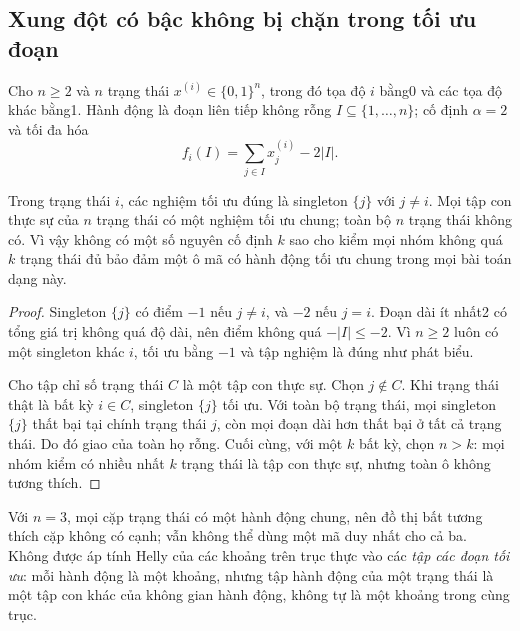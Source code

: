 \subsection{Xung đột có bậc không bị chặn trong tối ưu đoạn}
Cho $n\ge2$ và $n$ trạng thái $x^{(i)}\in\{0,1\}^n$, trong đó tọa độ $i$ bằng0 và các tọa độ khác bằng1. Hành động là đoạn liên tiếp không rỗng $I\subseteq\{1,\ldots,n\}$; cố định $\alpha=2$ và tối đa hóa
\[
f_i(I)=\sum_{j\in I}x_j^{(i)}-2|I|.
\]
\begin{theorem}\label{thm:conflict}
Trong trạng thái $i$, các nghiệm tối ưu đúng là singleton $\{j\}$ với $j\ne i$. Mọi tập con thực sự của $n$ trạng thái có một nghiệm tối ưu chung; toàn bộ $n$ trạng thái không có. Vì vậy không có một số nguyên cố định $k$ sao cho kiểm mọi nhóm không quá $k$ trạng thái đủ bảo đảm một ô mã có hành động tối ưu chung trong mọi bài toán dạng này.
\end{theorem}
\begin{proof}
Singleton $\{j\}$ có điểm $-1$ nếu $j\ne i$, và $-2$ nếu $j=i$. Đoạn dài ít nhất2 có tổng giá trị không quá độ dài, nên điểm không quá $-|I|\le-2$. Vì $n\ge2$ luôn có một singleton khác $i$, tối ưu bằng $-1$ và tập nghiệm là đúng như phát biểu.

Cho tập chỉ số trạng thái $C$ là một tập con thực sự. Chọn $j\notin C$. Khi trạng thái thật là bất kỳ $i\in C$, singleton $\{j\}$ tối ưu. Với toàn bộ trạng thái, mọi singleton $\{j\}$ thất bại tại chính trạng thái $j$, còn mọi đoạn dài hơn thất bại ở tất cả trạng thái. Do đó giao của toàn họ rỗng. Cuối cùng, với một $k$ bất kỳ, chọn $n>k$: mọi nhóm kiểm có nhiều nhất $k$ trạng thái là tập con thực sự, nhưng toàn ô không tương thích.
\end{proof}
Với $n=3$, mọi cặp trạng thái có một hành động chung, nên đồ thị bất tương thích cặp không có cạnh; vẫn không thể dùng một mã duy nhất cho cả ba. Không được áp tính Helly của các khoảng trên trục thực vào các \emph{tập các đoạn tối ưu}: mỗi hành động là một khoảng, nhưng tập hành động của một trạng thái là một tập con khác của không gian hành động, không tự là một khoảng trong cùng trục.

